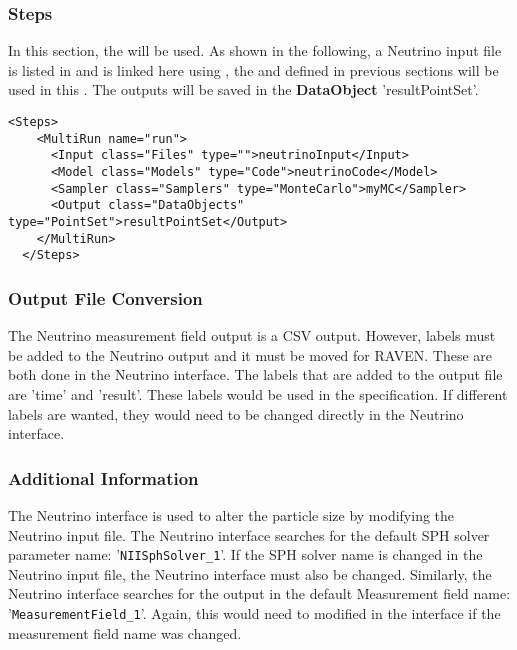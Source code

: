 \subsubsection{Steps}
In this section, the  will be used. As shown in the following, a Neutrino
input file is listed in  and is linked here using , the 
and  defined in previous sections will be used in this . The
outputs will be saved in the \textbf{DataObject} 'resultPointSet'.

\begin{lstlisting}[style=XML]
  <Steps>
    <MultiRun name="run">
      <Input class="Files" type="">neutrinoInput</Input>
      <Model class="Models" type="Code">neutrinoCode</Model>
      <Sampler class="Samplers" type="MonteCarlo">myMC</Sampler>
      <Output class="DataObjects" type="PointSet">resultPointSet</Output>
    </MultiRun>
  </Steps>
\end{lstlisting}

\subsubsection{Output File Conversion}
The Neutrino measurement field output is a CSV output. However, labels must be added to the Neutrino output
and it must be moved for RAVEN. These are both done in the Neutrino interface. The labels that are added to the
output file are 'time' and 'result'. These labels would be used in the  specification.
If different labels are wanted, they would need to be changed directly in the Neutrino interface.

\subsubsection{Additional Information}
The Neutrino interface is used to alter the particle size by modifying the Neutrino input file. The Neutrino interface
searches for the default SPH solver parameter name: '\texttt{NIISphSolver\_1}'. If the SPH solver name is changed in the
Neutrino input file, the Neutrino interface must also be changed. Similarly, the Neutrino interface searches for the
output in the default Measurement field name: '\texttt{MeasurementField\_1}'. Again, this would need to modified in the interface
if the measurement field name was changed.


